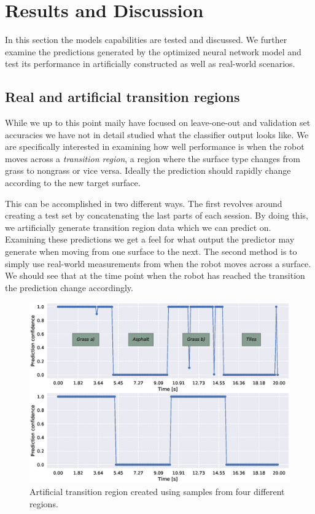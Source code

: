 \chapter{Results and Discussion}

In this section the models capabilities are tested and discussed. We further examine the predictions generated by the optimized neural network model and test its performance in artificially constructed as well as real-world scenarios. 

\section{Real and artificial transition regions}

While we up to this point maily have focused on leave-one-out and validation set accuracies we have not in detail studied what the classifier output looks like. We are specifically interested in examining how well performance is when the robot moves across a \emph{transition region}, a region where the surface type changes from grass to nongrass or vice versa. Ideally the prediction should rapidly change according to the new target surface. 

This can be accomplished in two different ways. The first revolves around creating a test set by concatenating the last parts of each session. By doing this, we artificially generate transition region data which we can predict on. Examining these predictions we get a feel for what output the predictor may generate when moving from one surface to the next. The second method is to simply use real-world measurements from when the robot moves across a surface. We should see that at the time point when the robot has reached the transition the prediction change accordingly. 

\begin{figure}
	\centering
	\includegraphics[scale=0.5]{figs_temp/varmats1}
	\caption{Artificial transition region created using samples from four different regions.}
\end{figure}

